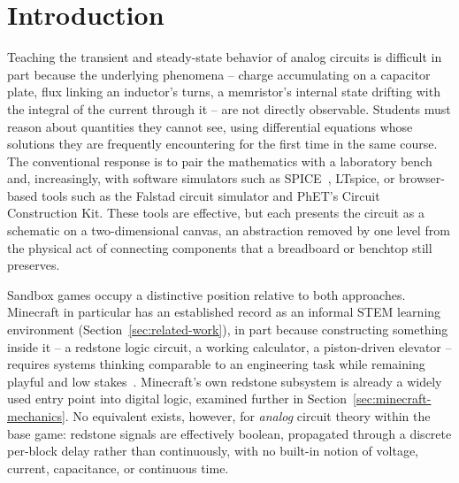 \section{Introduction}
\label{sec:introduction}

Teaching the transient and steady-state behavior of analog circuits is difficult in part
because the underlying phenomena -- charge accumulating on a capacitor plate, flux linking
an inductor's turns, a memristor's internal state drifting with the integral of the current
through it -- are not directly observable. Students must reason about quantities they cannot
see, using differential equations whose solutions they are frequently encountering for the
first time in the same course. The conventional response is to pair the mathematics with a
laboratory bench and, increasingly, with software simulators such as SPICE~\cite{nagel1973spice},
LTspice, or browser-based tools such as the Falstad circuit simulator and PhET's Circuit
Construction Kit. These tools are effective, but each presents the circuit as a schematic on
a two-dimensional canvas, an abstraction removed by one level from the physical act of
connecting components that a breadboard or benchtop still preserves.

Sandbox games occupy a distinctive position relative to both approaches. Minecraft in
particular has an established record as an informal STEM learning environment
(Section~\ref{sec:related-work}), in part because constructing something inside it -- a
redstone logic circuit, a working calculator, a piston-driven elevator -- requires systems
thinking comparable to an engineering task while remaining playful and low
stakes~\cite{nebel2016mining}. Minecraft's own redstone subsystem is already a widely used
entry point into digital logic, examined further in Section~\ref{sec:minecraft-mechanics}.
No equivalent exists, however, for \emph{analog} circuit theory within the base game:
redstone signals are effectively boolean, propagated through a discrete per-block delay
rather than continuously, with no built-in notion of voltage, current, capacitance, or
continuous time.

